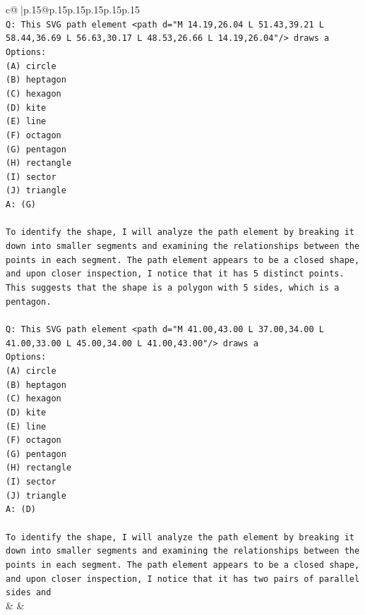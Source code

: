 \documentclass{article}
\begin{document}
{\begin{supertabular}{c@{$\;$}|p{.15\linewidth}@{}p{.15\linewidth}p{.15\linewidth}p{.15\linewidth}p{.15\linewidth}p{.15\linewidth}}
{{{\\ 
\texttt{Q: This SVG path element <path d="M 14.19,26.04 L 51.43,39.21 L 58.44,36.69 L 56.63,30.17 L 48.53,26.66 L 14.19,26.04"/> draws a} \\
\texttt{Options:} \\
\texttt{(A) circle} \\
\texttt{(B) heptagon} \\
\texttt{(C) hexagon} \\
\texttt{(D) kite} \\
\texttt{(E) line} \\
\texttt{(F) octagon} \\
\texttt{(G) pentagon} \\
\texttt{(H) rectangle} \\
\texttt{(I) sector} \\
\texttt{(J) triangle} \\
\texttt{A: (G)} \\
\\ 
\texttt{To identify the shape, I will analyze the path element by breaking it down into smaller segments and examining the relationships between the points in each segment. The path element appears to be a closed shape, and upon closer inspection, I notice that it has 5 distinct points. This suggests that the shape is a polygon with 5 sides, which is a pentagon.} \\
\\ 
\texttt{Q: This SVG path element <path d="M 41.00,43.00 L 37.00,34.00 L 41.00,33.00 L 45.00,34.00 L 41.00,43.00"/> draws a} \\
\texttt{Options:} \\
\texttt{(A) circle} \\
\texttt{(B) heptagon} \\
\texttt{(C) hexagon} \\
\texttt{(D) kite} \\
\texttt{(E) line} \\
\texttt{(F) octagon} \\
\texttt{(G) pentagon} \\
\texttt{(H) rectangle} \\
\texttt{(I) sector} \\
\texttt{(J) triangle} \\
\texttt{A: (D)} \\
\\ 
\texttt{To identify the shape, I will analyze the path element by breaking it down into smaller segments and examining the relationships between the points in each segment. The path element appears to be a closed shape, and upon closer inspection, I notice that it has two pairs of parallel sides and} \\
            }
        }
    }
    & & \\ \\


\end{supertabular}}
\end{document}

